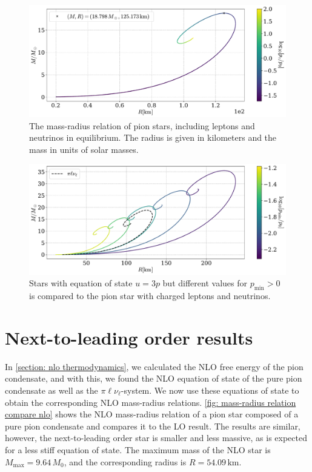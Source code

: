 \begin{figure}[H]
    \centering
    \includegraphics[width=.85\textwidth]{../scripts/figurer/pion_star/mass_radius_neutrino.pdf}
    \caption{
        The mass-radius relation of pion stars, including leptons and neutrinos in equilibrium.
        The radius is given in kilometers and the mass in units of solar masses.
        }
        \label{fig: mass radius neutrino}
\end{figure}


\begin{figure}[H]
    \centering
    \includegraphics[width=.85\textwidth]{../scripts/figurer/pion_star/mass_radius_light.pdf}
    \caption{Stars with equation of state $u = 3p$ but different values for $p_\text{min}>0$ is compared to the pion star with charged leptons and neutrinos.}
    \label{fig: light stars}
\end{figure}



\section{Next-to-leading order results}

In \autoref{section: nlo thermodynamics}, we calculated the NLO free energy of the pion condensate, and with this, we found the NLO equation of state of the pure pion condensate as well as the $\pi\ell\nu_\ell$-system.
We now use these equations of state to obtain the corresponding NLO mass-radius relations.
\autoref{fig: mass-radius relation compare nlo} shows the NLO mass-radius relation of a pion star composed of a pure pion condensate and compares it to the LO result.
The results are similar, however, the next-to-leading order star is smaller and less massive, as is expected for a less stiff equation of state.
The maximum mass of the NLO star is $M_\text{max} = 9.64\, M_0$, and the corresponding radius is $R = 54.09\,\text{km}$.

